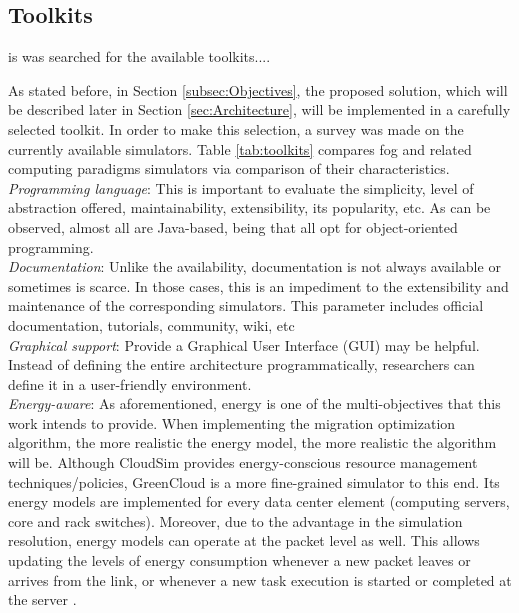 \subsection{Toolkits}
\label{sec:Toolkits}
is was searched for the available toolkits....

As stated before, in Section \ref{subsec:Objectives}, the proposed solution, which will be described later in Section \ref{sec:Architecture}, will be implemented in a carefully selected toolkit. In order to make this selection, a survey was made on the currently available simulators. Table \ref{tab:toolkits} compares fog and related computing paradigms simulators via comparison of their characteristics.\\
\noindent\tab \textit{Programming language}: This is important to evaluate the simplicity, level of abstraction offered, maintainability, extensibility, its popularity, etc. As can be observed, almost all are Java-based, being that all opt for object-oriented programming.\\
\noindent\tab \textit{Documentation}: Unlike the availability, documentation is not always available or sometimes is scarce. In those cases, this is an impediment to the extensibility and maintenance of the corresponding simulators. This parameter includes official documentation, tutorials, community, wiki, etc\\
\noindent\tab \textit{Graphical support}: Provide a Graphical User Interface (GUI) may be helpful. Instead of defining the entire architecture programmatically, researchers can define it in a user-friendly environment.\\
\noindent\tab \textit{Energy-aware}: As aforementioned, energy is one of the multi-objectives that this work intends to provide. When implementing the migration optimization algorithm, the more realistic the energy model, the more realistic the algorithm will be. Although CloudSim provides energy-conscious resource management techniques/policies, GreenCloud is a more fine-grained simulator to this end. Its energy models are implemented for every data center element (computing servers, core and rack switches). Moreover, due to the advantage in the simulation resolution, energy models can operate at the packet level as well. This allows updating the levels of energy consumption whenever a new packet leaves or arrives from the link, or whenever a new task execution is started or completed at the server \cite{kliazovich2012greencloud}.\\
